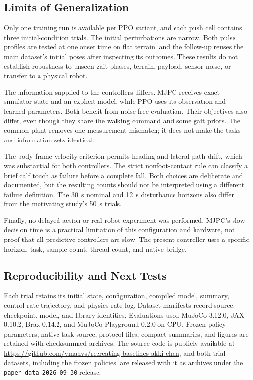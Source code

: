 \documentclass[conference]{IEEEtran}
\begin{document}
\subsection{Limits of Generalization}

Only one training run is available per PPO variant, and each push cell contains three initial-condition trials. The initial perturbations are narrow. Both pulse profiles are tested at one onset time on flat terrain, and the follow-up reuses the main dataset's initial poses after inspecting its outcomes. These results do not establish robustness to unseen gait phases, terrain, payload, sensor noise, or transfer to a physical robot.

The information supplied to the controllers differs. MJPC receives exact simulator state and an explicit model, while PPO uses its observation and learned parameters. Both benefit from noise-free evaluation. Their objectives also differ, even though they share the walking command and some gait priors. The common plant removes one measurement mismatch; it does not make the tasks and information sets identical.

The body-frame velocity criterion permits heading and lateral-path drift, which was substantial for both controllers. The strict nonfoot-contact rule can classify a brief calf touch as failure before a complete fall. Both choices are deliberate and documented, but the resulting counts should not be interpreted using a different failure definition. The 30~s nominal and 12~s disturbance horizons also differ from the motivating study's 50~s trials.

Finally, no delayed-action or real-robot experiment was performed. MJPC's slow decision time is a practical limitation of this configuration and hardware, not proof that all predictive controllers are slow. The present controller uses a specific horizon, task, sample count, thread count, and native bridge.

\subsection{Reproducibility and Next Tests}

Each trial retains its initial state, configuration, compiled model, summary, control-rate trajectory, and physics-rate log. Dataset manifests record source, checkpoint, model, and library identities. Evaluations used MuJoCo 3.12.0, JAX 0.10.2, Brax 0.14.2, and MuJoCo Playground 0.2.0 on CPU. Frozen policy parameters, native task source, protocol files, compact summaries, and figures are retained with checksummed archives. The source code is publicly available at \url{https://github.com/vmanvs/recreating-baselines-akki-chen}, and both trial datasets, including the frozen policies, are released with it as archives under the \texttt{paper-data-2026-09-30} release.
\end{document}
